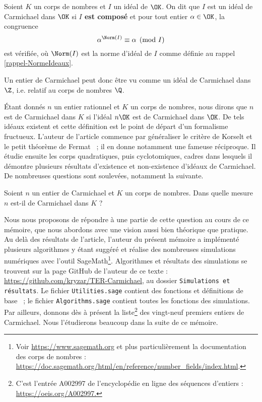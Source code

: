 \begin{definition} Soient $K$ un corps de nombres et $I$ un idéal de $\OK$. On dit que $I$ est un idéal de Carmichael dans $\OK$ si \textbf{$I$ est composé} et pour tout entier $\alpha \in \OK$, la congruence \[\alpha^{\Norm(I)} \equiv \alpha \pmod{I}\] est vérifiée, où $\Norm(I)$ est la norme d'idéal de $I$ comme définie au rappel \ref{rappel-NormeIdeaux}.
\end{definition}

\begin{remarque}
	Un entier de Carmichael peut donc être vu comme un idéal de Carmichael dans $\Z$, i.e. relatif au corps de nombres $\Q$.
\end{remarque}

Étant donnés $n$ un entier rationnel et $K$ un corps de nombres, nous dirons que $n$ est de Carmichael dans $K$ si l'idéal $n\OK$ est de Carmichael dans $\OK$. De tels idéaux existent et cette définition est le point de départ d'un formalisme fructueux. L'auteur de l'article commence par généraliser le critère de Korselt et le petit théorème de Fermat ~; il en donne notamment une fameuse réciproque. Il étudie ensuite les corps quadratiques, puis cyclotomiques, cadres dans lesquels il démontre plusieurs résultats d'existence et non-existence d'idéaux de Carmichael. De nombreuses questions sont soulevées, notamment la suivante. 

\begin{question}\label{question-centrale}Soient $n$ un entier de Carmichael et $K$ un corps de nombres. Dans quelle mesure $n$ est-il de Carmichael dans $K$ ?
\end{question}

Nous nous proposons de répondre à une partie de cette question au cours de ce mémoire, que nous abordons avec une vision aussi bien théorique que pratique. Au delà des résultats de l'article, l'auteur du présent mémoire a implémenté plusieurs algorithmes y étant suggéré et réalise des nombreuses simulations numériques avec l'outil SageMath\footnote{Voir \url{https://www.sagemath.org} et plus particulièrement la documentation des corps de nombres : \url{https://doc.sagemath.org/html/en/reference/number\_fields/index.html}.}. Algorithmes et résultats des simulations se trouvent sur la page GitHub de l'auteur de ce texte : \url{https://github.com/kryzar/TER-Carmichael}, au dossier \texttt{Simulations et résultats}. Le fichier \texttt{Utilities.sage} contient des fonctions et définitions de base ~; le fichier \texttt{Algorithms.sage} contient toutes les fonctions des simulations. Par ailleurs, donnons dès à présent la liste\footnote{C’est l'entrée A002997 de l'encyclopédie en ligne des séquences d’entiers : \url{https://oeis.org/A002997.}} des vingt-neuf premiers entiers de Carmichael. Nous l'étudierons beaucoup dans la suite de ce mémoire.

